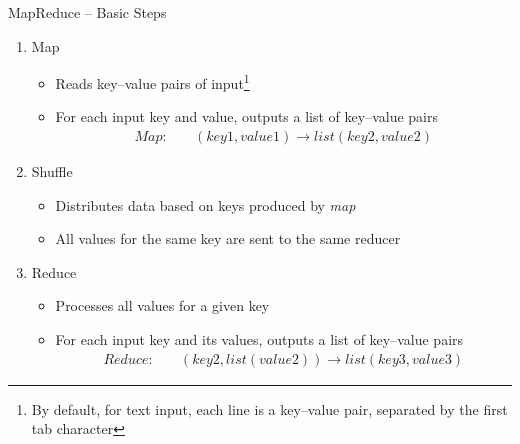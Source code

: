 \documentclass[ignorenonframetext,xcolor=x11names]{beamer}
\begin{document}
\begin{frame}[label=full]{MapReduce -- Basic Steps}
\begin{enumerate}
\item Map
\begin{itemize}
   \item Reads key--value pairs of input\footnote{By default, for text input, each line is a key--value pair, separated by the first tab character}
   \item For each input key and value, outputs a list of key--value pairs
\begin{align*}
Map: &\quad(key1, value1) \rightarrow list(key2, value2)
\end{align*}
\vspace{-1.25\baselineskip}
\end{itemize}
\item Shuffle
\begin{itemize}
   \item Distributes data based on keys produced by \emph{map}
   \item All values for the same key are sent to the same reducer
\end{itemize}
\item Reduce
\begin{itemize}
   \item Processes all values for a given key
   \item For each input key and its values, outputs a list of key--value pairs
\begin{align*}
Reduce: &\quad(key2, list(value2)) \rightarrow list(key3, value3)
\end{align*}
\end{itemize}
\end{enumerate}
\end{frame}
\end{document}
